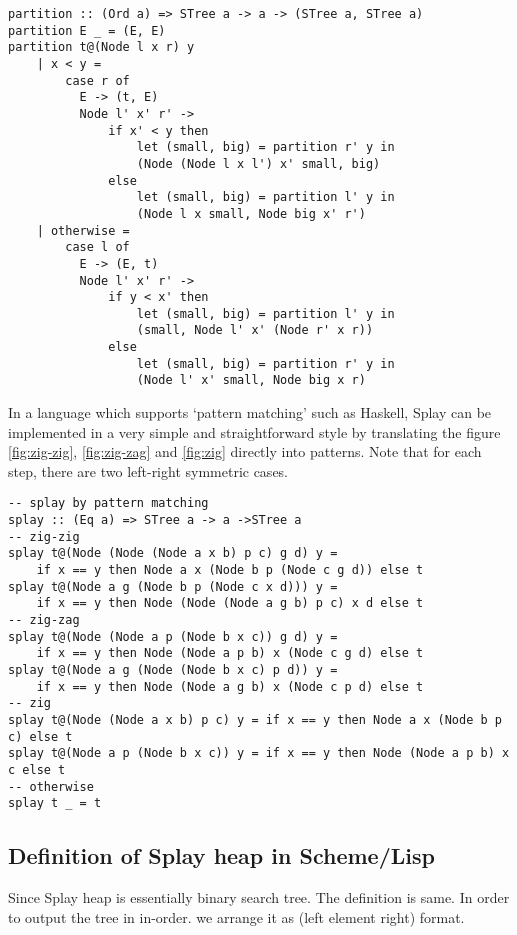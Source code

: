\documentclass{article}
\begin{document}
\begin{lstlisting}
partition :: (Ord a) => STree a -> a -> (STree a, STree a)
partition E _ = (E, E)
partition t@(Node l x r) y
    | x < y =
        case r of
          E -> (t, E)
          Node l' x' r' ->
              if x' < y then
                  let (small, big) = partition r' y in
                  (Node (Node l x l') x' small, big)
              else
                  let (small, big) = partition l' y in
                  (Node l x small, Node big x' r')
    | otherwise =
        case l of
          E -> (E, t)
          Node l' x' r' ->
              if y < x' then
                  let (small, big) = partition l' y in
                  (small, Node l' x' (Node r' x r))
              else
                  let (small, big) = partition r' y in
                  (Node l' x' small, Node big x r)
\end{lstlisting}

In a language which supports `pattern matching' such as Haskell,
Splay can be implemented in a very simple and straightforward style
by translating the figure \ref{fig:zig-zig}, \ref{fig:zig-zag} and
\ref{fig:zig} directly into patterns. Note that for each step,
there are two left-right symmetric cases.

\lstset{language=Haskell}
\begin{lstlisting}
-- splay by pattern matching
splay :: (Eq a) => STree a -> a ->STree a
-- zig-zig
splay t@(Node (Node (Node a x b) p c) g d) y =
    if x == y then Node a x (Node b p (Node c g d)) else t
splay t@(Node a g (Node b p (Node c x d))) y =
    if x == y then Node (Node (Node a g b) p c) x d else t
-- zig-zag
splay t@(Node (Node a p (Node b x c)) g d) y =
    if x == y then Node (Node a p b) x (Node c g d) else t
splay t@(Node a g (Node (Node b x c) p d)) y =
    if x == y then Node (Node a g b) x (Node c p d) else t
-- zig
splay t@(Node (Node a x b) p c) y = if x == y then Node a x (Node b p c) else t
splay t@(Node a p (Node b x c)) y = if x == y then Node (Node a p b) x c else t
-- otherwise
splay t _ = t
\end{lstlisting}

\subsection*{Definition of Splay heap in Scheme/Lisp}

Since Splay heap is essentially binary search tree. The definition
is same. In order to output the tree in in-order. we arrange it
as (left element right) format.
\end{document}
